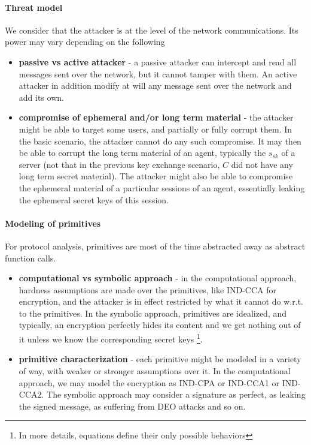 \documentclass{article}
\newcommand{\sfsk}{\mathit{sk}}
\begin{document}
\paragraph{Threat model}

We consider that the attacker is at the level of the network communications. Its power may vary depending on the following 

\begin{itemize}
\item \textbf{passive vs active attacker} - a passive attacker can intercept and read all messages sent over the network, but it cannot tamper with them. An active attacker in addition modify at will any message sent over the network and add its own.
  \item \textbf{compromise of ephemeral and/or long term material} - the attacker might be able to target some users, and partially or fully corrupt them. In the basic scenario, the attacker cannot do any such compromise. It may then be able to corrupt the long term material of an agent, typically the $s_\sfsk$ of a server (not that in the previous key exchange scenario, $C$ did not have any long term secret material).  The attacker might also be able to compromise the ephemeral material of a particular sessions of an agent, essentially leaking the ephemeral secret keys of this session.
 \end{itemize}

 \paragraph{Modeling of  primitives} For protocol analysis, primitives are most of the time abstracted away as abstract function calls. 

 \begin{itemize}
 \item \textbf{computational vs symbolic approach} - in the computational approach, hardness assumptions are made over the primitives, like IND-CCA for encryption, and the attacker is in effect restricted by what it cannot do w.r.t. to the primitives. In the symbolic approach, primitives are idealized, and typically, an encryption perfectly hides its content and we get nothing out of it unless we know the corresponding secret keys \footnote{In more details, equations define their only possible behaviors}.
\item \textbf{primitive characterization} - each primitive might be modeled in a variety of way, with weaker or stronger assumptions over it. In the computational approach, we may model the encryption as IND-CPA or IND-CCA1 or IND-CCA2. The symbolic approach may consider a signature as perfect, as leaking the signed message, as suffering from  DEO attacks and so on.    
\end{itemize}
\end{document}
